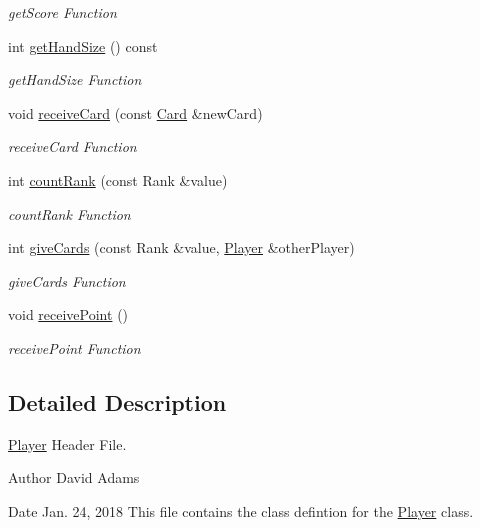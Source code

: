 \begin{DoxyCompactItemize}
\begin{DoxyCompactList}\small\item\em get\-Score Function \end{DoxyCompactList}\item 
int \hyperlink{classPlayer_a994684bcf41571317faf1c1fd480dde2}{get\-Hand\-Size} () const 
\begin{DoxyCompactList}\small\item\em get\-Hand\-Size Function \end{DoxyCompactList}\item 
void \hyperlink{classPlayer_aa4e4a7dc3f44f5535d15e5e649c76330}{receive\-Card} (const \hyperlink{classCard}{Card} \&new\-Card)
\begin{DoxyCompactList}\small\item\em receive\-Card Function \end{DoxyCompactList}\item 
int \hyperlink{classPlayer_adefd8c025da7fa4022047cb50c4c799e}{count\-Rank} (const Rank \&value)
\begin{DoxyCompactList}\small\item\em count\-Rank Function \end{DoxyCompactList}\item 
int \hyperlink{classPlayer_aed23835c6855de249d3fc1f1cfd97f29}{give\-Cards} (const Rank \&value, \hyperlink{classPlayer}{Player} \&other\-Player)
\begin{DoxyCompactList}\small\item\em give\-Cards Function \end{DoxyCompactList}\item 
void \hyperlink{classPlayer_ac975ba281b0c77796d170c37ce88b95f}{receive\-Point} ()
\begin{DoxyCompactList}\small\item\em receive\-Point Function \end{DoxyCompactList}\end{DoxyCompactItemize}


\subsection{Detailed Description}
\hyperlink{classPlayer}{Player} Header File. 

\begin{DoxyAuthor}{Author}
David Adams 
\end{DoxyAuthor}
\begin{DoxyDate}{Date}
Jan. 24, 2018 This file contains the class defintion for the \hyperlink{classPlayer}{Player} class. 
\end{DoxyDate}


